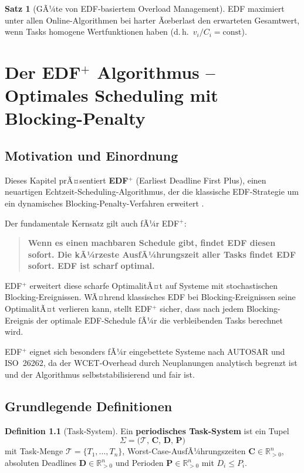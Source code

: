 ﻿\documentclass[a4paper,12pt]{report}
\theoremstyle{definition}
\newtheorem{definition}{Definition}[chapter]
\newtheorem{satz}{Satz}[chapter]
\begin{document}
\begin{satz}[GÃ¼te von EDF-basiertem Overload Management]
	EDF maximiert unter allen Online-Algorithmen bei harter Ãœberlast den
	erwarteten Gesamtwert, wenn Tasks homogene Wertfunktionen haben (d.\,h.\
	$v_i/C_i = \mathrm{const}$).
\end{satz}

\chapter{Der EDF\texorpdfstring{$^+$}{+} Algorithmus -- Optimales Scheduling mit Blocking-Penalty}
\label{chap:edfplus}

\section{Motivation und Einordnung}

Dieses Kapitel prÃ¤sentiert \textbf{EDF$^+$} (Earliest Deadline First Plus),
einen neuartigen Echtzeit-Scheduling-Algorithmus, der die klassische EDF-Strategie
um ein dynamisches Blocking-Penalty-Verfahren erweitert \cite{Epp2026}.

Der fundamentale Kernsatz gilt auch fÃ¼r EDF$^+$:

\begin{quote}
\textbf{Wenn es einen machbaren Schedule gibt, findet EDF diesen sofort.
Die kÃ¼rzeste AusfÃ¼hrungszeit aller Tasks findet EDF sofort. EDF ist scharf optimal.}
\end{quote}

EDF$^+$ erweitert diese scharfe OptimalitÃ¤t auf Systeme mit stochastischen
Blocking-Ereignissen. WÃ¤hrend klassisches EDF bei Blocking-Ereignissen seine
OptimalitÃ¤t verlieren kann, stellt EDF$^+$ sicher, dass nach jedem
Blocking-Ereignis der optimale EDF-Schedule fÃ¼r die verbleibenden Tasks
berechnet wird.

EDF$^+$ eignet sich besonders fÃ¼r eingebettete Systeme nach AUTOSAR und
ISO~26262, da der WCET-Overhead durch Neuplanungen analytisch begrenzt ist
und der Algorithmus selbststabilisierend und fair ist.

\section{Grundlegende Definitionen}

\begin{definition}[Task-System]
	Ein \textbf{periodisches Task-System} ist ein Tupel
	\[
		\Sigma = \bigl(\mathcal{T},\, \mathbf{C},\, \mathbf{D},\, \mathbf{P}\bigr)
	\]
	mit Task-Menge $\mathcal{T} = \{T_1,\ldots,T_n\}$, Worst-Case-AusfÃ¼hrungszeiten
	$\mathbf{C} \in \mathbb{R}_{>0}^n$, absoluten Deadlines $\mathbf{D} \in \mathbb{R}_{>0}^n$
	und Perioden $\mathbf{P} \in \mathbb{R}_{>0}^n$ mit $D_i \le P_i$.
\end{definition}
\end{document}
